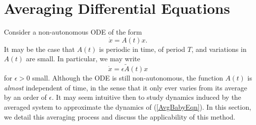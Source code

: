 \documentclass[12pt]{UOthesis}
\theoremstyle{remarkstyle}
\begin{document}
\section{Averaging Differential Equations}
\label{SectionAvgDifEq}

Consider a non-autonomous ODE of the form
$$\dot{x}=A(t)x.$$
It may be the case that $A(t)$ is periodic in time, of period $T$, and variations in $A(t)$ are small. In particular, we may write
\begin{equation}
	\dot{x}=\epsilon \tilde{A}(t)x
	\label{AvgBabyEqn}
\end{equation}
for $\epsilon>0$ small. Although the ODE is still non-autonomous, the function $A(t)$ is \textit{almost} independent of time, in the sense that it only ever varies from its average by an order of $\epsilon$. It may seem intuitive then to study dynamics induced by the averaged system to approximate the dynamics of (\ref{AvgBabyEqn}). In this section, we detail this averaging process and discuss the applicability of this method.\\
\end{document}
